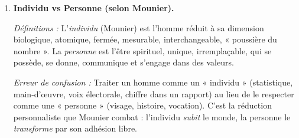 \documentclass[11pt]{article}
\begin{document}
\begin{corrige}
\begin{enumerate}
\item \textbf{Individu vs Personne (selon Mounier).}
\par \textit{Définitions :} L'\emph{individu} (Mounier) est l'homme réduit à sa dimension biologique, atomique, fermée, mesurable, interchangeable, « poussière du nombre ». La \emph{personne} est l'être spirituel, unique, irremplaçable, qui se possède, se donne, communique et s'engage dans des valeurs.
\par \textit{Erreur de confusion :} Traiter un homme comme un « individu » (statistique, main-d'œuvre, voix électorale, chiffre dans un rapport) au lieu de le respecter comme une « personne » (visage, histoire, vocation). C'est la réduction personnaliste que Mounier combat : l'individu \emph{subit} le monde, la personne le \emph{transforme} par son adhésion libre.
\end{enumerate}
\end{corrige}
\end{document}
